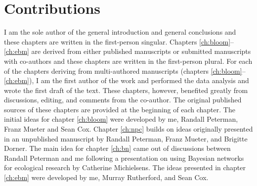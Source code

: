 \section{Contributions}

I am the sole author of the general introduction and general conclusions and
these chapters are written in the first-person singular. Chapters
\ref{ch:bloom}--\ref{ch:ebm} are derived from either published manuscripts or
submitted manuscripts with co-authors and these chapters are written in the
first-person plural. For each of the chapters deriving from multi-authored
manuscripts (chapters \ref{ch:bloom}--\ref{ch:ebm}), I am the first author of
the work and performed the data analysis and wrote the first draft of the text.
These chapters, however, benefited greatly from discussions, editing, and
comments from the co-author. The original published sources of these chapters
are provided at the beginning of each chapter. The initial ideas for chapter
\ref{ch:bloom} were developed by me, Randall Peterman, Franz Mueter and Sean
Cox. Chapter \ref{ch:npc} builds on ideas originally presented in an unpublished
manuscript by Randall Peterman, Franz Mueter, and Brigitte Dorner. The main idea
for chapter \ref{ch:bn} came out of discussions between Randall Peterman and me
following a presentation on using Bayesian networks for ecological research by
Catherine Michielsens. The ideas presented in chapter \ref{ch:ebm} were
developed by me, Murray Rutherford, and Sean Cox.

